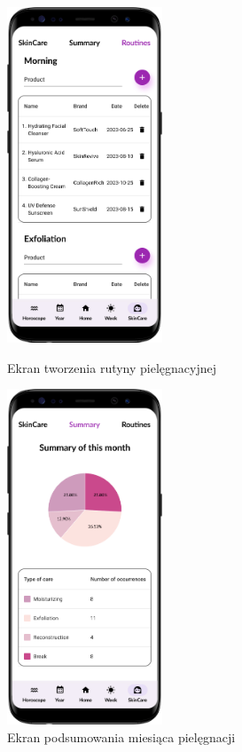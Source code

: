 \begin{figure}[t]
	\begin{minipage}{0.4\textwidth}
		\centering
		\includegraphics[height=10cm, keepaspectratio]{images/interfejs_figma/SkinCare-Routines}
		\caption{Ekran tworzenia rutyny pielęgnacyjnej}
		\label{fig:Routines}
	\end{minipage}
	\hfill
	\begin{minipage}{0.4\textwidth}
		\centering
		\includegraphics[height=10cm,           keepaspectratio]{images/interfejs_figma/SkinCare-Summary}
		\caption{Ekran podsumowania miesiąca pielęgnacji}
		\label{fig:Summary}
	\end{minipage}
\end{figure}

